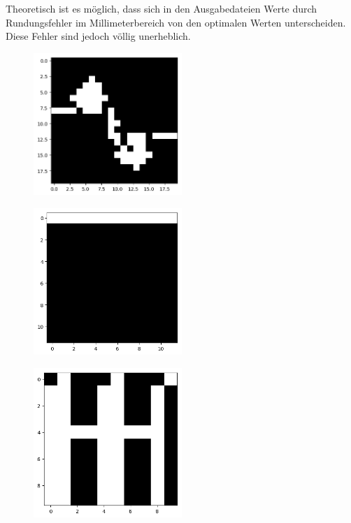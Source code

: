 \documentclass[a4paper, notitlepage, 12pt]{scrartcl}
\begin{document}
Theoretisch ist es möglich, dass sich in den Ausgabedateien Werte durch Rundungsfehler im Millimeterbereich von den optimalen Werten unterscheiden. Diese Fehler sind jedoch völlig unerheblich.
\begin{multicols}{2}
\begin{figure}[H]
\centering \includegraphics[width=0.5\textwidth]{pics/wildschwein1-lsg-top_to_bot_bool.png}
\end{figure}

\begin{figure}[H]
\centering \includegraphics[width=0.5\textwidth]{pics/wildschwein2-lsg-top_to_bot_bool.png}
\end{figure}

\begin{figure}[H]
\centering \includegraphics[width=0.5\textwidth]{pics/wildschwein3-lsg-top_to_bot_bool.png}
\end{figure}


\end{multicols}
\end{document}
